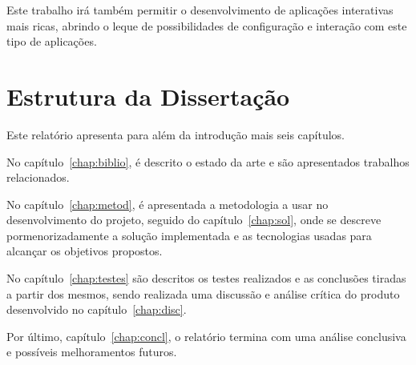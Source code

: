 Este trabalho irá também permitir o desenvolvimento de aplicações interativas mais ricas, abrindo o leque de possibilidades de configuração e interação com este tipo de aplicações. 

\section{Estrutura da Dissertação} \label{sec:struct}

Este relatório apresenta para além da introdução mais seis capítulos.

No capítulo~\ref{chap:biblio}, é descrito o estado da arte e são
apresentados trabalhos relacionados. 

No capítulo~\ref{chap:metod}, é apresentada a metodologia a usar no desenvolvimento do projeto, seguido do capítulo~\ref{chap:sol}, onde se descreve pormenorizadamente a solução implementada e as  tecnologias usadas para alcançar os objetivos propostos.

No capítulo~\ref{chap:testes} são descritos os testes realizados e as conclusões tiradas a partir dos mesmos, sendo realizada uma discussão e análise crítica do produto desenvolvido no capítulo~\ref{chap:disc}.

Por último, capítulo~\ref{chap:concl}, o relatório termina com uma análise conclusiva e possíveis melhoramentos futuros.
